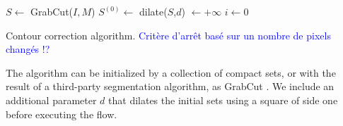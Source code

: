 \documentclass[runningheads]{llncs}
\newcommand{\todo}[1]{{\textcolor{blue}{#1}}}
\begin{document}
\begin{algorithm}[H]
 
 \BlankLine

 $S \longleftarrow$ GrabCut($I,M$)\;
 $S^{(0)} \longleftarrow $ dilate($S$,$d$)\; 
 \Delta $\longleftarrow +\infty$\;
 $i \longleftarrow 0$\;
 \label{alg:contour-correction} 
 \caption{Contour correction algorithm. \todo{Critère d'arrêt basé sur un nombre de pixels changés !?}}
\end{algorithm}	

The algorithm can be initialized by a collection of compact sets, or with the result of a third-party segmentation algorithm, as GrabCut \cite{rother04grabcut}. We include an additional parameter $d$ that dilates the initial sets using a square of side one before executing the flow.
	
\end{document}

